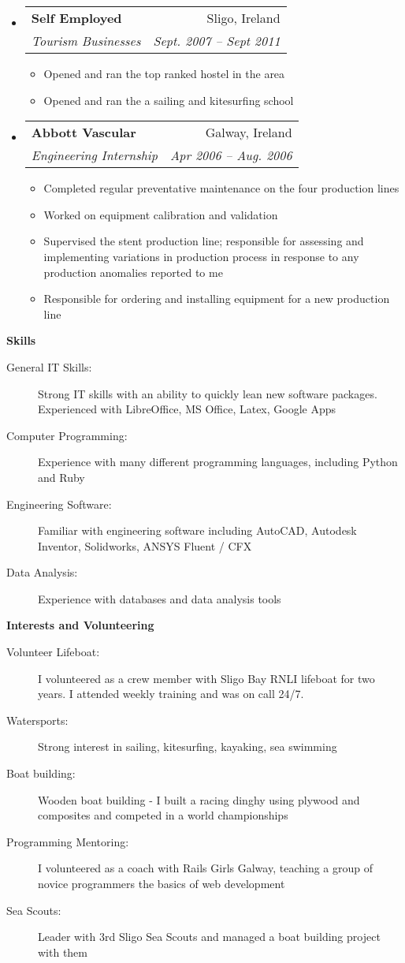 \documentclass[letterpaper,11pt]{article}
\makeatletter
\newcommand{\resitem}[1]{\item #1 \vspace{-2pt}}
\newcommand{\resheading}[1]{{\large \colorbox{mygrey}{\begin{minipage}{\textwidth}{\textbf{#1 \vphantom{p\^{E}}}}\end{minipage}}}}
\newcommand{\ressubheading}[4]{
\begin{tabular*}{6.5in}{l@{\extracolsep{\fill}}r}
		\textbf{#1} & #2 \\
		\textit{#3} & \textit{#4} \\
\end{tabular*}\vspace{-6pt}}
\makeatother
\begin{document}
\begin{itemize}
		  \item 
      \ressubheading{Self Employed}{Sligo, Ireland}{Tourism Businesses}{Sept. 2007 -- Sept 2011}
        {
        \begin{itemize}
       	 \resitem{Opened and ran the top ranked hostel in the area}
         \resitem{Opened and ran the a sailing and kitesurfing school}
        \end{itemize}
        }
        
        	\item 
      \ressubheading{Abbott Vascular}{Galway, Ireland}{Engineering Internship}{Apr 2006 -- Aug. 2006}
      {
      \begin{itemize}
      \resitem{Completed regular preventative maintenance on the four production lines}
      \resitem{Worked on equipment calibration and validation}
      \resitem{Supervised the stent production line; responsible for assessing and implementing variations in production process in response to any production anomalies reported to me}
      \resitem{Responsible for ordering and installing equipment for a new production line}
      \end{itemize}
      }

	\end{itemize}  %

\resheading{Skills}
	\begin{description}
		\item[General IT Skills:] Strong IT skills with an ability to quickly lean new software packages. Experienced with LibreOffice, MS Office, Latex, Google Apps 
		\item[Computer Programming:] Experience with many different programming languages, including Python and Ruby
    \item[Engineering Software:] Familiar with engineering software including AutoCAD, Autodesk Inventor, Solidworks, ANSYS Fluent / CFX
    \item[Data Analysis:] Experience with databases and data analysis tools
	\end{description} %

\resheading{Interests and Volunteering}
	\begin{description}
		\item[Volunteer Lifeboat:] I volunteered as a crew member with Sligo Bay RNLI lifeboat for two years. I attended weekly training and was on call 24/7.
		\item[Watersports:] Strong interest in sailing, kitesurfing, kayaking, sea swimming
		\item[Boat building:] Wooden boat building - I built a racing dinghy using plywood and composites and competed in a world championships
		\item[Programming Mentoring:] I volunteered as a coach with Rails Girls Galway, teaching a group of novice programmers the basics of web development
		\item[Sea Scouts:] Leader with 3rd Sligo Sea Scouts and managed a boat building project with them

	\end{description} %
\end{document}
